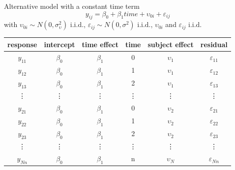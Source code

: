 \documentclass[aspectratio=169]{beamer}
\begin{document}
\begin{frame}{Alternative model with a constant time term}
  \centering
  \vspace{-1cm}
  \[
    y_{ij} = \beta_0 + \beta_1 time + \upsilon_{0i} + \varepsilon_{ij}
  \]
with $\upsilon_{0i} \sim N(0, \sigma^2_{\upsilon})$ i.i.d.,
$\varepsilon_{ij} \sim N(0, \sigma^2)$ i.i.d., $\upsilon_{0i}$ and
$\varepsilon_{ij}$ i.i.d.\\[2ex]

  \begin{tabular}{cccccc}
    \hline
    response & intercept & time effect & time & subject effect  & residual \\
    \hline
    $y_{11}$ & $\beta_0$ & $\beta_1$   & 0    & $\upsilon_{1}$ & $\varepsilon_{11}$ \\
    $y_{12}$ & $\beta_0$ & $\beta_1$   & 1    & $\upsilon_{1}$ & $\varepsilon_{12}$ \\
    $y_{13}$ & $\beta_0$ & $\beta_1$   & 2    & $\upsilon_{1}$ & $\varepsilon_{13}$ \\
    \vdots & \vdots & \vdots   & \vdots & \vdots & \vdots \\
    $y_{21}$ & $\beta_0$ & $\beta_1$   & 0    & $\upsilon_{2}$ & $\varepsilon_{21}$ \\
    $y_{22}$ & $\beta_0$ & $\beta_1$   & 1    & $\upsilon_{2}$ & $\varepsilon_{22}$ \\
    $y_{23}$ & $\beta_0$ & $\beta_1$   & 2    & $\upsilon_{2}$ & $\varepsilon_{23}$ \\
    \vdots & \vdots & \vdots   & \vdots & \vdots & \vdots \\
    $y_{Nn}$ & $\beta_0$ & $\beta_1$   & n    & $\upsilon_{N}$ & $\varepsilon_{Nn}$ \\
    \hline
  \end{tabular}
\end{frame}
\end{document}

